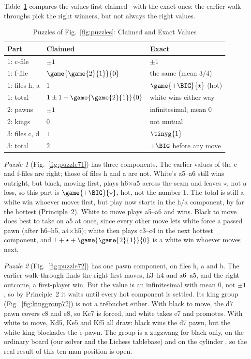 Table~\ref{tab:puzzles} compares the values first claimed~\cite{Study2025} with the exact ones: the earlier
walk-throughs pick the right winners, but not always the right values.

\begin{table}[!t]
\centering
\caption{Puzzles of Fig.~\ref{fig:puzzles}: Claimed and Exact Values }
\label{tab:puzzles}
\begin{tabular}{@{}lll@{}}
\toprule
Part & Claimed~\cite{Study2025} & Exact \\
\midrule
1: c-file & $\pm1$ & $\pm1$ \\
1: f-file & $\game{\game{2}{1}}{0}$ & the same (mean $3/4$) \\
1: files h, a & $1$ & $\game{+\BIG}{\star}$ (hot) \\
1: total & $1\pm1+\game{\game{2}{1}}{0}$ & white wins either way \\
2: pawns & $\pm1$ & infinitesimal, mean $0$ \\
2: kings & $0$ & not mutual \\
3: files c, d & $1$ & $\tinyg{1}$ \\
3: total & $2$ & $+\BIG$ before any move \\
\bottomrule
\end{tabular}
\end{table}

\emph{Puzzle 1} (Fig.~\ref{fig:puzzle71}) has three components. The earlier values of the c- and f-files are right;
those of files h and a are not. White's a5--a6 still wins
outright, but black, moving first, plays h6$\times$a5 across the seam and leaves $\star$, not a loss, so this
part is $\game{+\BIG}{\star}$, hot, not the number $1$. The total is still a white win whoever moves first, but
play now starts in the h/a component, by far the hottest (Principle~2). White to move plays a5--a6 and wins.
Black to move does best to take on a5 at once, since every other move lets white force a passed pawn (after
h6--h5, a4$\times$h5); white then plays c3--c4 in the next hottest component, and
$1+\star+\game{\game{2}{1}}{0}$ is a white win whoever moves next.

\emph{Puzzle 2} (Fig.~\ref{fig:puzzle72}) has one pawn component, on files h, a and b. The earlier walk-through
finds the right first moves, h3--h4 and a6--a5, and the right outcome, a first-player win. But the value is an
infinitesimal with mean $0$, not $\pm1$, so by Principle~2 it waits until every hot component is settled.
Its king group (Fig.~\ref{fig:kinggroup72}) is not a tr\'ebuchet either. With black to move, the d7 pawn covers
c8 and e8, so Kc7 is forced, and white takes e7 and promotes. With white to move, Kd5, Ke5 and Kf5 all draw:
black wins the d7 pawn, but the white king blockades the e-pawn. The group is a zugzwang for black only, on the
ordinary board  (our solver and the Lichess tablebase) and on the cylinder , so the real result
of this ten-man position is open.

